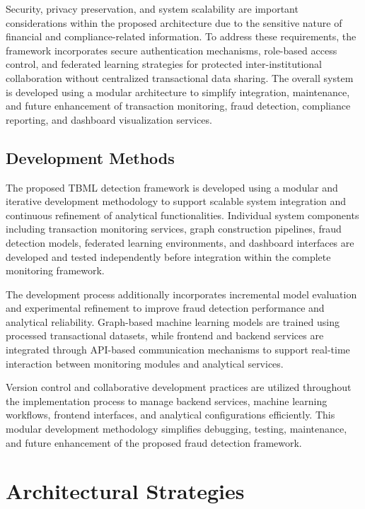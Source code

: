 Security, privacy preservation, and system scalability are important considerations within the proposed architecture due to the sensitive nature of financial and compliance-related information. To address these requirements, the framework incorporates secure authentication mechanisms, role-based access control, and federated learning strategies for protected inter-institutional collaboration without centralized transactional data sharing. The overall system is developed using a modular architecture to simplify integration, maintenance, and future enhancement of transaction monitoring, fraud detection, compliance reporting, and dashboard visualization services.


\subsection[Development Methods]{\textbf{Development Methods}}

The proposed TBML detection framework is developed using a modular and iterative development methodology to support scalable system integration and continuous refinement of analytical functionalities. Individual system components including transaction monitoring services, graph construction pipelines, fraud detection models, federated learning environments, and dashboard interfaces are developed and tested independently before integration within the complete monitoring framework.

The development process additionally incorporates incremental model evaluation and experimental refinement to improve fraud detection performance and analytical reliability. Graph-based machine learning models are trained using processed transactional datasets, while frontend and backend services are integrated through API-based communication mechanisms to support real-time interaction between monitoring modules and analytical services.

Version control and collaborative development practices are utilized throughout the implementation process to manage backend services, machine learning workflows, frontend interfaces, and analytical configurations efficiently. This modular development methodology simplifies debugging, testing, maintenance, and future enhancement of the proposed fraud detection framework.

\section[Architectural Strategies]{\textbf{Architectural Strategies}}

